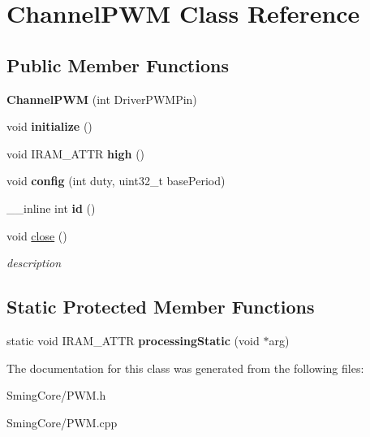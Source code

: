 \hypertarget{class_channel_p_w_m}{}\section{Channel\+P\+W\+M Class Reference}
\label{class_channel_p_w_m}
\subsection*{Public Member Functions}
\begin{DoxyCompactItemize}
\item 
\hypertarget{class_channel_p_w_m_a6500439bb0b080044af78a5a9965dc33}{}{\bfseries Channel\+P\+W\+M} (int Driver\+P\+W\+M\+Pin)\label{class_channel_p_w_m_a6500439bb0b080044af78a5a9965dc33}

\item 
\hypertarget{class_channel_p_w_m_a9db74b3292965d910aaeb2b0ecf59d61}{}void {\bfseries initialize} ()\label{class_channel_p_w_m_a9db74b3292965d910aaeb2b0ecf59d61}

\item 
\hypertarget{class_channel_p_w_m_a06d385554f9bd4e8342b95c5f1aca4f6}{}void I\+R\+A\+M\+\_\+\+A\+T\+T\+R {\bfseries high} ()\label{class_channel_p_w_m_a06d385554f9bd4e8342b95c5f1aca4f6}

\item 
\hypertarget{class_channel_p_w_m_ac32b4f5a3eb4a4fbd2d462df309553b0}{}void {\bfseries config} (int duty, uint32\+\_\+t base\+Period)\label{class_channel_p_w_m_ac32b4f5a3eb4a4fbd2d462df309553b0}

\item 
\hypertarget{class_channel_p_w_m_a24a1819242da35acaaefbbfdff8c2ece}{}\+\_\+\+\_\+inline int {\bfseries id} ()\label{class_channel_p_w_m_a24a1819242da35acaaefbbfdff8c2ece}

\item 
\hypertarget{class_channel_p_w_m_a2aa0afa2262e9f97da1361313c6bbd85}{}void \hyperlink{class_channel_p_w_m_a2aa0afa2262e9f97da1361313c6bbd85}{close} ()\label{class_channel_p_w_m_a2aa0afa2262e9f97da1361313c6bbd85}

\begin{DoxyCompactList}\small\item\em description \end{DoxyCompactList}\end{DoxyCompactItemize}
\subsection*{Static Protected Member Functions}
\begin{DoxyCompactItemize}
\item 
\hypertarget{class_channel_p_w_m_a93cdebdad210a5844fe53d81a030f4e8}{}static void I\+R\+A\+M\+\_\+\+A\+T\+T\+R {\bfseries processing\+Static} (void $\ast$arg)\label{class_channel_p_w_m_a93cdebdad210a5844fe53d81a030f4e8}

\end{DoxyCompactItemize}


The documentation for this class was generated from the following files\+:\begin{DoxyCompactItemize}
\item 
Sming\+Core/P\+W\+M.\+h\item 
Sming\+Core/P\+W\+M.\+cpp\end{DoxyCompactItemize}
